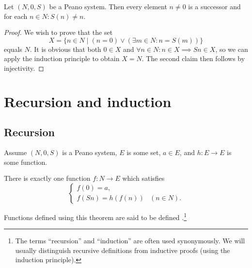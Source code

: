 \begin{lemma} \label{successor}
Let $(N,0,S)$ be a Peano system. Then every element $n\neq 0$ is a successor and for each $n\in N: S(n) \neq n$.
\end{lemma}
\begin{proof}
We wish to prove that the set
\[ X = \{n\in N\;|\; (n=0)\lor(\exists m\in N: n = S(m))\} \]
equals $N$. It is obvious that both $0\in X$ and $\forall n\in N: n\in X \implies Sn \in X$, so we can apply the induction principle to obtain $X=N$. The second claim then follows by injectivity.
\end{proof}
\section{Recursion and induction}
\subsection{Recursion}
\begin{theorem}
Assume $(N,0,S)$ is a Peano system, $E$ is some set, $a\in E$, and $h:E\to E$ is some function.

There is exactly one function $f: N\to E$ which satisfies
\[ \begin{cases}
f(0) = a, \\
f(Sn) = h(f(n)) & (n\in N).
\end{cases} \]
\end{theorem}
Functions defined using this theorem are said to be defined .\footnote{The terms ``recursion'' and ``induction'' are often used synonymously. We
will usually distinguish recursive definitions from inductive
proofs (using the induction principle).}
